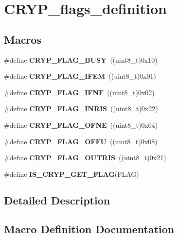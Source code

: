 \section{C\+R\+Y\+P\+\_\+flags\+\_\+definition}
\label{group__CRYP__flags__definition}
\subsection*{Macros}
\begin{DoxyCompactItemize}
\item 
\#define \textbf{ C\+R\+Y\+P\+\_\+\+F\+L\+A\+G\+\_\+\+B\+U\+SY}~((uint8\+\_\+t)0x10)
\item 
\#define \textbf{ C\+R\+Y\+P\+\_\+\+F\+L\+A\+G\+\_\+\+I\+F\+EM}~((uint8\+\_\+t)0x01)
\item 
\#define \textbf{ C\+R\+Y\+P\+\_\+\+F\+L\+A\+G\+\_\+\+I\+F\+NF}~((uint8\+\_\+t)0x02)
\item 
\#define \textbf{ C\+R\+Y\+P\+\_\+\+F\+L\+A\+G\+\_\+\+I\+N\+R\+IS}~((uint8\+\_\+t)0x22)
\item 
\#define \textbf{ C\+R\+Y\+P\+\_\+\+F\+L\+A\+G\+\_\+\+O\+F\+NE}~((uint8\+\_\+t)0x04)
\item 
\#define \textbf{ C\+R\+Y\+P\+\_\+\+F\+L\+A\+G\+\_\+\+O\+F\+FU}~((uint8\+\_\+t)0x08)
\item 
\#define \textbf{ C\+R\+Y\+P\+\_\+\+F\+L\+A\+G\+\_\+\+O\+U\+T\+R\+IS}~((uint8\+\_\+t)0x21)
\item 
\#define \textbf{ I\+S\+\_\+\+C\+R\+Y\+P\+\_\+\+G\+E\+T\+\_\+\+F\+L\+AG}(F\+L\+AG)
\end{DoxyCompactItemize}


\subsection{Detailed Description}


\subsection{Macro Definition Documentation}
\mbox{\label{group__CRYP__flags__definition_ga701f57afbf29f56f57eadc76835008ce}} 
